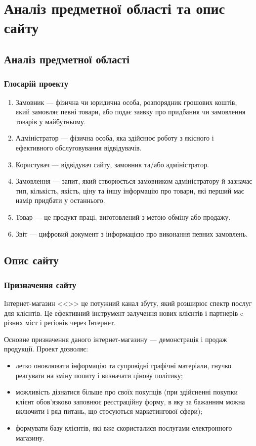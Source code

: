 \section{Аналіз предметної області та опис сайту}
\subsection{Аналіз предметної області}
\subsubsection{Глосарій проекту}
\begin{enumerate}
    \item Замовник --- фізична чи юридична особа, розпорядник грошових коштів, який замовляє певні товари, або подає заявку про придбання чи замовлення товарів у майбутньому. 
    \item Адміністратор --- фізична особа, яка здійснює роботу з якісного і ефективного обслуговування відвідувачів. 
    \item Користувач --- відвідувач сайту, замовник та/або адміністратор. 
    \item Замовлення --- запит, який створюється замовником адміністратору й зазначає тип, кількість, якість, ціну та іншу інформацію про товари, які перший має намір придбати у останнього. 
    \item Товар --- це продукт праці, виготовлений з метою обміну або продажу.
    \item Звіт --- цифровий документ з інформацією про виконання певних замовлень. 
\end{enumerate}

\subsection{Опис сайту}
\subsubsection{Призначення сайту}
Інтернет-магазин <<\thesitename>> це потужний канал збуту, який розширює спектр послуг для клієнтів.
Це ефективний інструмент залучення нових клієнтів і партнерів c різних міст і регіонів через Інтернет.

Основне призначення даного інтернет-магазину --- демонстрація і продаж продукції.
Проект дозволяє:
\begin{itemize}
    \item легко оновлювати інформацію та супровідні графічні матеріали, гнучко реагувати на зміну попиту і визначати цінову політику;
    \item можливість дізнатися більше про своїх покупців (при здійсненні покупки клієнт обов'язково заповнює реєстраційну форму, в яку за бажанням можна включити і ряд питань, що стосуються маркетингової сфери);
    \item формувати базу клієнтів, які вже скористалися послугами електронного магазину.
\end{itemize}

